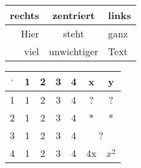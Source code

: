 \documentclass{book}
\begin{document}
\begin{tabular}{r|c|l}
  rechts & zentriert & links \\ \hline \hline
  Hier & steht & ganz \\
  viel & unwichtiger & Text 
\end{tabular}
    
\begin{tabular}{|c|c c c c c c|}
  \hline
  $\cdot$ & 1 & 2 & 3 & 4 & x & y \\ \hline 
  1 & 1 & 2 & 3 & 4 & ? & ? \\  
  2 & 1 & 2 & 3 & 4 & * & * \\  
  \cline{6-7}
  3 & 1 & 2 & 3 & 4 & \multicolumn{2}{|c|}{ ? } \\  
  \cline{6-7}
  4 & 1 & 2 & 3 & 4 & 4x & $x^2$ \\ \hline 
\end{tabular}
\end{document}
